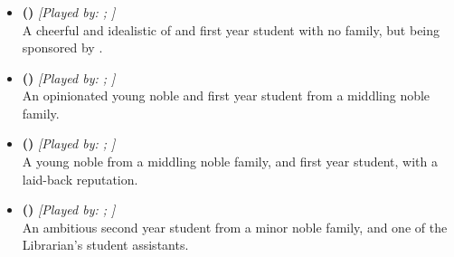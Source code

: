 \documentclass[blue]{GL2020}
\begin{document}
\subsubsection*{\pFarm{}}
\begin{itemize}
    \item \textbf{\cDisney{\full} (\cDisney{\MYcharpronouns})} \textit{[Played by: \cDisney{\MYplayer}; \cDisney{\MYplayerpronouns}]}\\ A cheerful and idealistic \cDisney{\cleric} of \cFarmGod{} and first year student with no family, but being sponsored by \cWildCard{}.
    
    \item \textbf{\cAdopted{\full} (\cAdopted{\MYcharpronouns})} \textit{[Played by: \cAdopted{\MYplayer}; \cAdopted{\MYplayerpronouns}]}\\ An opinionated young noble and first year student from a middling noble family.

    \item \textbf{\cChupStudent{\full} (\cChupStudent{\MYcharpronouns})} \textit{[Played by: \cChupStudent{\MYplayer}; \cChupStudent{\MYplayerpronouns}]}\\ A young noble from a middling noble family, and first year student, with a laid-back reputation.
   	 
    \item \textbf{\cLibAssist{\full} (\cLibAssist{\MYcharpronouns})} \textit{[Played by: \cLibAssist{\MYplayer}; \cLibAssist{\MYplayerpronouns}]}\\ An ambitious second year student from a minor noble family, and one of the Librarian's student assistants.
\end{itemize}
\end{document}
